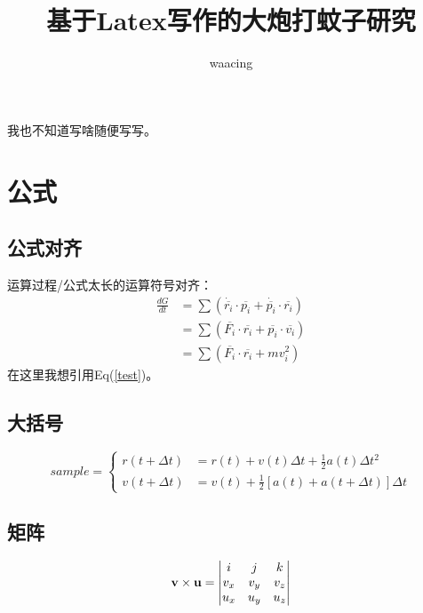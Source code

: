 \documentclass[UTF8,a4paper,10pt]{article}
\title{基于Latex写作的大炮打蚊子研究}
\author{waacing}
\begin{document}
	\maketitle 
	我也不知道写啥随便写写。
	\section{公式}
	\subsection{公式对齐}
	运算过程/公式太长的运算符号对齐：
	\begin{equation} \label{test}
		\begin{aligned}
			\frac{dG}{dt}&=\sum(\dot{\overline{r_i}}\cdot \overline{p_i} + \dot{\overline{p_i}} \cdot \overline{r_i} ) \\
			&=\sum(\overline{F_i}\cdot \overline{r_i} + \overline{p_i} \cdot \overline{v_i}) \\
			&=\sum(\overline{F_i}\cdot \overline{r_i} + mv_i^2)
		\end{aligned}
	\end{equation}
	在这里我想引用Eq(\ref{test})。
	
	\subsection{大括号}
	\begin{equation}
		sample = \left\{ 
		\begin{aligned}
			r(t+\Delta t)&=r(t)+v(t)\Delta t+\frac{1}{2}a(t)\Delta t^2 \\
			v(t+\Delta t)&=v(t)+\frac{1}{2}[a(t)+a(t+\Delta t)]\Delta t
		\end{aligned}
		\right.
	\end{equation}
	
	\subsection{矩阵}
	\begin{equation} 
		\begin{gathered}
			\vb{v} \times \vb{u} = 
			\begin{aligned}
				\begin{vmatrix} 
					i & j & k \\ 
					v_x & v_y  & v_z \\ 
					u_x & u_y & u_z
				\end{vmatrix}
			\end{aligned}
		\end{gathered}
	\end{equation}
\end{document}

